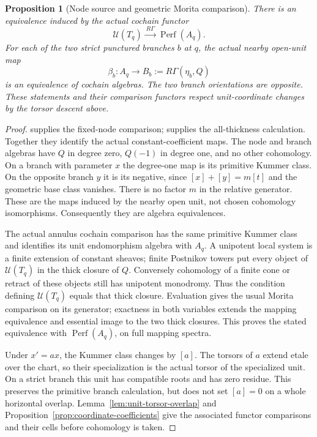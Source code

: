 \documentclass[11pt]{article}
\newtheorem{proposition}[theorem]{Proposition}
\theoremstyle{definition}
\theoremstyle{remark}
\newcommand{\Perf}{\operatorname{Perf}}
\begin{document}
\begin{proposition}[Node source and geometric Morita comparison]
\label{prop:node-source}
There is an equivalence induced by the actual cochain functor
\[
 \mathcal U(T_q)\xrightarrow{\ R\Gamma\ }\Perf(A_q).
\]
For each of the two strict punctured branches $b$ at $q$, the actual
nearby open-unit map
\[
 \beta_b:A_q\longrightarrow B_b:=R\Gamma(\eta_b,Q)
\]
is an equivalence of cochain algebras.  The two branch orientations
are opposite.  These statements and their comparison functors
respect unit-coordinate changes by the torsor descent above.
\end{proposition}
\begin{proof}
 \cite{Local} supplies the fixed-node comparison;
 \cite[\texttt{prop:all-thickness-nearby}]{Refinement} supplies the
 all-thickness calculation.  Together they identify the actual
 constant-coefficient maps.  The node and branch
algebras have $Q$ in degree zero, $Q(-1)$ in degree one, and no other
cohomology.  On a branch with parameter $x$ the degree-one map is
its primitive Kummer class.  On the opposite branch $y$ it is its
negative, since $[x]+[y]=m[t]$ and the geometric base class vanishes.
There is no factor $m$ in the relative generator.  These are the
maps induced by the nearby open unit, not chosen cohomology
isomorphisms.  Consequently they are algebra equivalences.

The actual annulus cochain comparison has the same primitive Kummer
class and identifies its unit endomorphism algebra with $A_q$.
A unipotent local system is a finite extension of constant sheaves;
finite Postnikov towers put every object of $\mathcal U(T_q)$ in
the thick closure of $Q$.  Conversely cohomology of a finite cone
or retract of these objects still has unipotent monodromy.  Thus the
condition defining $\mathcal U(T_q)$ equals that thick closure.
Evaluation gives the usual Morita comparison on its generator;
exactness in both variables extends the mapping equivalence and
essential image to the two thick closures.  This proves the stated
equivalence with $\Perf(A_q)$, on full mapping spectra.

Under $x'=ax$, the Kummer class changes by $[a]$.  The torsors of
$a$ extend etale over the chart, so their specialization is the
actual torsor of the specialized unit.  On a strict branch this
unit has compatible roots and has zero residue.  This preserves the
primitive branch calculation, but does not set $[a]=0$ on a whole
horizontal overlap.  Lemma~\ref{lem:unit-torsor-overlap} and
Proposition~\ref{prop:coordinate-coefficients} give the associated
functor comparisons and their cells before cohomology is taken.
\end{proof}
\end{document}

